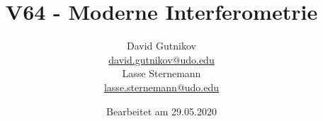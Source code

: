 

\title{V64 - Moderne Interferometrie}
\author{
  David Gutnikov\\
  \href{mailto:david.gutnikov@udo.edu}{david.gutnikov@udo.edu}\\
  Lasse Sternemann\\
  \href{mailto:lasse.sternemann@udo.edu}{lasse.sternemann@udo.edu}
}
\date{Bearbeitet am 29.05.2020}


    \maketitle
    \newpage
    \tableofcontents
    \newpage

    
    
    

    \newpage
    \printbibliography

